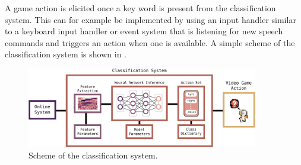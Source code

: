 A game action is elicited once a key word is present from the classification system.
This can for example be implemented by using an input handler similar to a keyboard input handler or event system that is listening for new speech commands and triggers an action when one is available.
A simple scheme of the classification system is shown in .
\begin{figure}[!ht]
  \centering
  \includegraphics[width=0.9\textwidth]{./6_game/figs/game_system_classification.pdf}
  \caption{Scheme of the classification system.}
  \label{fig:game_system_classification}
\end{figure}
\FloatBarrier
\noindent

